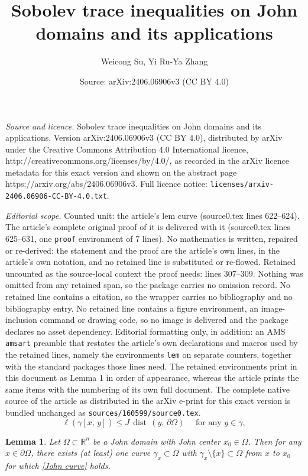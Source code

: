 \documentclass[10pt,a4paper]{amsart}
\title{Sobolev trace inequalities on John domains and its applications}
\author{Weicong Su, Yi Ru-Ya Zhang}
\date{Source: arXiv:2406.06906v3 (CC BY 4.0)}
\newtheorem{lem}{Lemma}
\def\dist{{\mathop\mathrm{\,dist\,}}}
\def\gz{{\gamma}}
\begin{document}
\maketitle

\noindent\emph{Source and licence.} Sobolev trace inequalities on John domains and its applications. Version arXiv:2406.06906v3 (CC BY 4.0), distributed by arXiv under the Creative Commons Attribution 4.0 International licence, http://creativecommons.org/licenses/by/4.0/, as recorded in the arXiv licence metadata for this exact version and shown on the abstract page https://arxiv.org/abs/2406.06906v3. Full licence notice: \texttt{licenses/arxiv-2406.06906-CC-BY-4.0.txt}.\par\smallskip

\noindent\textit{Editorial scope.} Counted unit: the article's lem curve (source0.tex lines 622--624). The article's complete original proof of it is delivered with it (source0.tex lines 625--631, one \texttt{proof} environment of 7 lines). No mathematics is written, repaired or re-derived: the statement and the proof are the article's own lines, in the article's own notation, and no retained line is substituted or re-flowed.  Retained uncounted as the source-local context the proof needs: lines 307--309.  Nothing was omitted from any retained span, so the package carries no omission record.  No retained line contains a citation, so the wrapper carries no bibliography and no bibliography entry.  No retained line contains a figure environment, an image-inclusion command or drawing code, so no image is delivered and the package declares no asset dependency.  Editorial formatting only, in addition: an AMS \texttt{amsart} preamble that restates the article's own declarations and macros used by the retained lines, namely the environments \texttt{lem} on separate counters, together with the standard packages those lines need.  The retained environments print in this document as Lemma 1 in order of appearance, whereas the article prints the same items with the numbering of its own full document.  The complete native source of the article as distributed in the arXiv e-print for this exact version is bundled unchanged as \texttt{sources/160599/source0.tex}.
\begin{equation}\label{John curve}
\ell(\gamma[x,\,y])\le J\dist(y,\,\partial \Omega) \quad \text{ for any $y\in \gamma$}, 
\end{equation}

\begin{lem}\label{lem:boundary curve}
    Let $\Omega\subset\mathbb R^n$ be a John domain with John center $x_0\in \Omega$. Then for any $x\in \partial \Omega$, there exists (at least) one  curve $\gamma_x\subset \overline{\Omega}$ with $\gz_x\setminus\{x\}\subset \Omega$ from $x$ to $x_0$ for which \eqref{John curve} holds. 
\end{lem}
\end{document}
